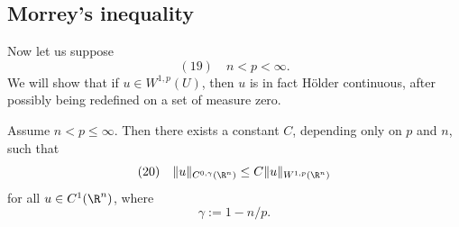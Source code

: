 \subsection{Morrey's inequality}

Now let us suppose
$$(19) \quad n < p < \infty.$$
We will show that if $u \in W^{1,p}(U)$, then $u$ is in fact Hölder continuous, after possibly being redefined on a set of measure zero.

\begin{theorem}
\label{thm:morreys-inequality}
Assume $n < p \le \infty$. Then there exists a constant $C$, depending only on $p$ and $n$, such that
$$(20) \quad \|u\|_{C^{0,\gamma}(\R^n)} \le C\|u\|_{W^{1,p}(\R^n)}$$
for all $u \in C^1(\R^n)$, where
$$\gamma := 1 - n/p.$$
\end{theorem}

